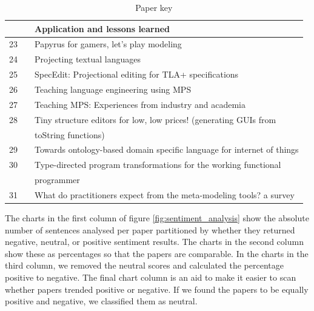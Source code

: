 \begin{table}
\begin{center}
\begin{tabular}{ |c  c|l | }
                &                                        & Application and lessons learned                                             \\ \hline
            23  & \cite{bucchiarone2020papyrus_SLR}      & Papyrus for gamers, let’s play modeling                                     \\ \hline
            24  & \cite{merino2021projecting_SLR}        & Projecting textual languages                                                \\ \hline
            25  & \cite{cuinat2020specedit_SLR}          & SpecEdit: Projectional editing for TLA+ specifications                      \\ \hline
            26  & \cite{prinz2021teaching_SLR}           & Teaching language engineering using MPS                                     \\ \hline
            27  & \cite{barash2021teaching_SLR}          & Teaching MPS: Experiences from industry and academia                        \\ \hline
            28  & \cite{hempel2020tiny_SLR}              & Tiny structure editors for low, low prices! (generating GUIs from           \\
                &                                        & toString functions)                                                         \\ \hline
            29  & \cite{negm2020towards_SLR}             & Towards ontology-based domain specific language for internet of things      \\ \hline
            30  & \cite{lubin2020type_SLR}               & Type-directed program transformations for the working functional            \\
                &                                        & programmer                                                                  \\ \hline
            31  & \cite{ozkaya2021practitioners_SLR}     & What do practitioners expect from the meta-modeling tools? a survey         \\ \hline
        \end{tabular}
    \end{center}
    \caption{Paper key}
    \label{table:paper_key}
\end{table}

The charts in the first column of figure \ref{fig:sentiment_analysis} show the absolute number of sentences analysed per paper partitioned by whether they returned negative, neutral, or positive sentiment results.
The charts in the second column show these as percentages so that the papers are comparable.
In the charts in the third column, we removed the neutral scores and calculated the percentage positive to negative.
The final chart column is an aid to make it easier to scan whether papers trended positive or negative.
If we found the papers to be equally positive and negative, we classified them as neutral.

